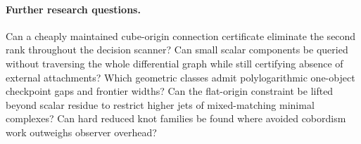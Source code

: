 \paragraph{Further research questions.}
Can a cheaply maintained cube-origin connection certificate eliminate
the second rank throughout the decision scanner? Can small scalar
components be queried without traversing the whole differential graph
while still certifying absence of external attachments?
Which geometric classes admit polylogarithmic one-object checkpoint
gaps and frontier widths? Can the flat-origin constraint be lifted beyond
scalar residue to restrict higher jets of mixed-matching minimal
complexes? Can hard reduced knot families be found where avoided
cobordism work outweighs observer overhead?

